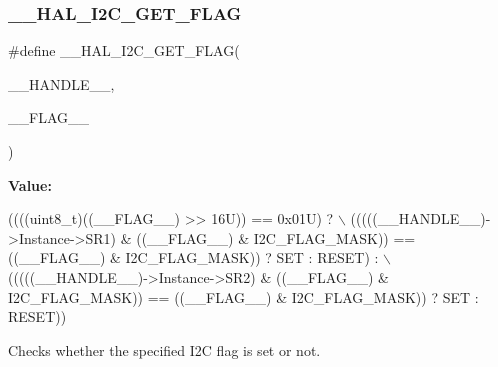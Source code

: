 \subsubsection{\texorpdfstring{\+\_\+\+\_\+\+H\+A\+L\+\_\+\+I2\+C\+\_\+\+G\+E\+T\+\_\+\+F\+L\+AG}{\_\_HAL\_I2C\_GET\_FLAG}}
{\footnotesize\ttfamily \#define \+\_\+\+\_\+\+H\+A\+L\+\_\+\+I2\+C\+\_\+\+G\+E\+T\+\_\+\+F\+L\+AG(\begin{DoxyParamCaption}\item[{}]{\+\_\+\+\_\+\+H\+A\+N\+D\+L\+E\+\_\+\+\_\+,  }\item[{}]{\+\_\+\+\_\+\+F\+L\+A\+G\+\_\+\+\_\+ }\end{DoxyParamCaption})}

{\bfseries Value\+:}
\begin{DoxyCode}
((((uint8\_t)((\_\_FLAG\_\_) >> 16U)) == 0x01U) ? \(\backslash\)
                                                  (((((\_\_HANDLE\_\_)->Instance->SR1) & ((\_\_FLAG\_\_) & 
      I2C\_FLAG\_MASK)) == ((\_\_FLAG\_\_) & I2C\_FLAG\_MASK)) ? SET : RESET) : \(\backslash\)
                                                  (((((\_\_HANDLE\_\_)->Instance->SR2) & ((\_\_FLAG\_\_) & 
      I2C\_FLAG\_MASK)) == ((\_\_FLAG\_\_) & I2C\_FLAG\_MASK)) ? SET : RESET))
\end{DoxyCode}


Checks whether the specified I2C flag is set or not. 


